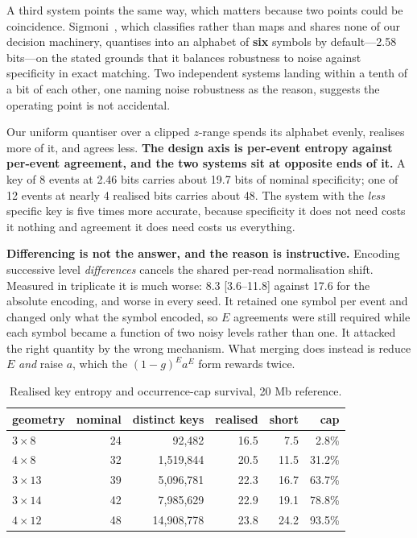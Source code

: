 \documentclass[sigconf,nonacm]{acmart}
\begin{document}
A third system points the same way, which matters because two points could be coincidence.
Sigmoni~\cite{sigmoni}, which classifies rather than maps and shares none of our decision
machinery, quantises into an alphabet of \textbf{six} symbols by default---2.58 bits---on the
stated grounds that it balances robustness to noise against specificity in exact matching. Two
independent systems landing within a tenth of a bit of each other, one naming noise robustness
as the reason, suggests the operating point is not accidental.

Our uniform quantiser over a clipped $z$-range spends its alphabet evenly, realises more of it,
and agrees less. \textbf{The design axis is per-event entropy against per-event agreement, and
the two systems sit at opposite ends of it.} A key of 8 events at 2.46 bits carries about 19.7
bits of nominal specificity; one of 12 events at nearly 4 realised bits carries about 48. The
system with the \emph{less} specific key is five times more accurate, because specificity it
does not need costs it nothing and agreement it does need costs us everything.

\textbf{Differencing is not the answer, and the reason is instructive.} Encoding successive
level \emph{differences} cancels the shared per-read normalisation shift. Measured in triplicate
it is much worse: 8.3 [3.6--11.8] against 17.6 for the absolute encoding, and worse in every
seed. It retained one symbol per event and changed only what the symbol encoded, so $E$
agreements were still required while each symbol became a function of two noisy levels rather
than one. It attacked the right quantity by the wrong mechanism. What merging does instead is
reduce $E$ \emph{and} raise $a$, which the $(1-g)^{E} a^{E}$ form rewards twice.

\begin{table}[t]
\caption{Realised key entropy and occurrence-cap survival, 20 Mb reference.}
\label{tab:entropy}
\small
\begin{tabular}{lrrrrr}
\toprule
geometry & nominal & distinct keys & realised & short & cap \\
\midrule
$3 \times 8$  & 24 & 92,482     & 16.5 & 7.5  & 2.8\%  \\
$4 \times 8$  & 32 & 1,519,844  & 20.5 & 11.5 & 31.2\% \\
$3 \times 13$ & 39 & 5,096,781  & 22.3 & 16.7 & 63.7\% \\
$3 \times 14$ & 42 & 7,985,629  & 22.9 & 19.1 & 78.8\% \\
$4 \times 12$ & 48 & 14,908,778 & 23.8 & 24.2 & 93.5\% \\
\bottomrule
\end{tabular}
\end{table}
\end{document}
